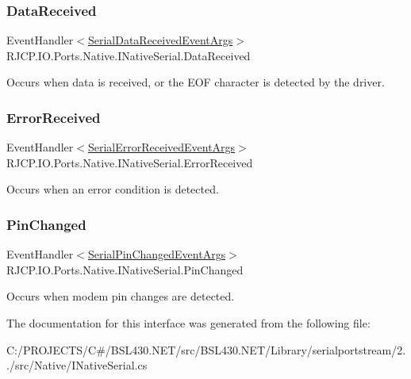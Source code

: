 \subsubsection{\texorpdfstring{DataReceived}{DataReceived}}
{\footnotesize\ttfamily Event\+Handler$<$\mbox{\hyperlink{class_r_j_c_p_1_1_i_o_1_1_ports_1_1_serial_data_received_event_args}{Serial\+Data\+Received\+Event\+Args}}$>$ R\+J\+C\+P.\+I\+O.\+Ports.\+Native.\+I\+Native\+Serial.\+Data\+Received}



Occurs when data is received, or the E\+OF character is detected by the driver. 

\mbox{\label{interface_r_j_c_p_1_1_i_o_1_1_ports_1_1_native_1_1_i_native_serial_ada6f81da52ba3cff2a6b638472d271c6}} 
\subsubsection{\texorpdfstring{ErrorReceived}{ErrorReceived}}
{\footnotesize\ttfamily Event\+Handler$<$\mbox{\hyperlink{class_r_j_c_p_1_1_i_o_1_1_ports_1_1_serial_error_received_event_args}{Serial\+Error\+Received\+Event\+Args}}$>$ R\+J\+C\+P.\+I\+O.\+Ports.\+Native.\+I\+Native\+Serial.\+Error\+Received}



Occurs when an error condition is detected. 

\mbox{\label{interface_r_j_c_p_1_1_i_o_1_1_ports_1_1_native_1_1_i_native_serial_a1f934013b560395e908d2bf93dc9b914}} 
\subsubsection{\texorpdfstring{PinChanged}{PinChanged}}
{\footnotesize\ttfamily Event\+Handler$<$\mbox{\hyperlink{class_r_j_c_p_1_1_i_o_1_1_ports_1_1_serial_pin_changed_event_args}{Serial\+Pin\+Changed\+Event\+Args}}$>$ R\+J\+C\+P.\+I\+O.\+Ports.\+Native.\+I\+Native\+Serial.\+Pin\+Changed}



Occurs when modem pin changes are detected. 



The documentation for this interface was generated from the following file\+:\begin{DoxyCompactItemize}
\item 
C\+:/\+P\+R\+O\+J\+E\+C\+T\+S/\+C\#/\+B\+S\+L430.\+N\+E\+T/src/\+B\+S\+L430.\+N\+E\+T/\+Library/serialportstream/2../src/\+Native/I\+Native\+Serial.\+cs\end{DoxyCompactItemize}
